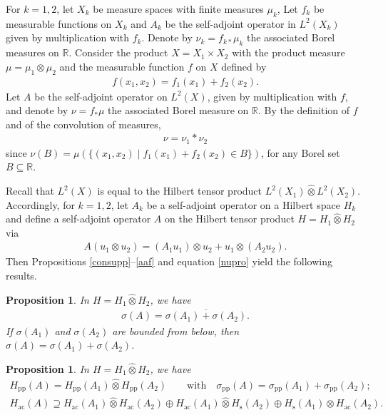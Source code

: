 \documentclass[10pt,a4paper]{amsart}
\numberwithin{equation}{section}
\newtheorem{Proposition}[Theorem]{Proposition}
\def\p{\mathrm{pp}}
\def\ac{\mathrm{ac}}
\def\s{\mathrm s}
\def\R{\mathbb R}
\begin{document}
For $k=1,2$, let $X_k$ be measure spaces with finite measures $\mu_k$,
Let $f_k$ be measurable functions on $X_k$ and $A_k$ be the self-adjoint operator in $L^2(X_k)$
given by multiplication with $f_k$.
Denote by $\nu_k=f_{k*}\mu_k$ the associated Borel measures on $\R$.
Consider the product $X=X_1\times X_2$ with the product measure $\mu=\mu_1\otimes\mu_2$
and the measurable function $f$ on $X$ defined by
\begin{align*}
 f(x_1,x_2) = f_1(x_1) + f_2(x_2).
\end{align*}
Let $A$ be the self-adjoint operator on $L^2(X)$, given by multiplication with $f$,
and denote by $\nu=f_*\mu$ the associated Borel measure on $\R$.
By the definition of $f$ and of the convolution of measures,
\begin{align}\label{nupro}
	\nu = \nu_1*\nu_2
\end{align}
since $\nu(B)=\mu(\{(x_1,x_2)\mid f_1(x_1)+f_2(x_2)\in B\})$, for any Borel set $B\subseteq\R$.

Recall that $L^2(X)$ is equal to the Hilbert tensor product $L^2(X_1)\hat\otimes L^2(X_2)$.
Accordingly, for $k=1,2$, let $A_k$ be a self-adjoint operator on a Hilbert space $H_k$
and define a self-adjoint operator $A$ on the Hilbert tensor product $H=H_1\hat\otimes H_2$ via
\begin{align*}%
	A(u_1\otimes u_2) = (A_1u_1)\otimes u_2 + u_1\otimes(A_2u_2).
\end{align*}
Then Propositions \ref{consupp}--\ref{aaf} and equation \eqref{nupro}
yield the following results.

\begin{Proposition}\label{suma}
In $H=H_1\hat\otimes H_2$, we have
\begin{align*}
	\sigma(A) = \overline{\sigma(A_1)+\sigma(A_2)}.
\end{align*}
If $\sigma(A_1)$ and $\sigma(A_2)$ are bounded from below,
then $\sigma(A)=\sigma(A_1)+\sigma(A_2)$.
\end{Proposition}

\begin{Proposition}%
In $H=H_1\hat\otimes H_2$, we have
\begin{gather*}
	H_{\p}(A) = H_{\p}(A_1) \hat\otimes H_{\p}(A_2) \qquad\text{with}\quad
	\sigma_{\p}(A) = \sigma_{\p}(A_1) + \sigma_{\p}(A_2); \\
	H_{\ac}(A) \supseteq
	H_{\ac}(A_1) \hat\otimes H_{\ac}(A_2) \oplus H_{\ac}(A_1) \hat\otimes H_{\s}(A_2)
	\oplus H_{\s}(A_1) \hat\otimes H_{\ac}(A_2).
\end{gather*}
\end{Proposition}
\end{document}
